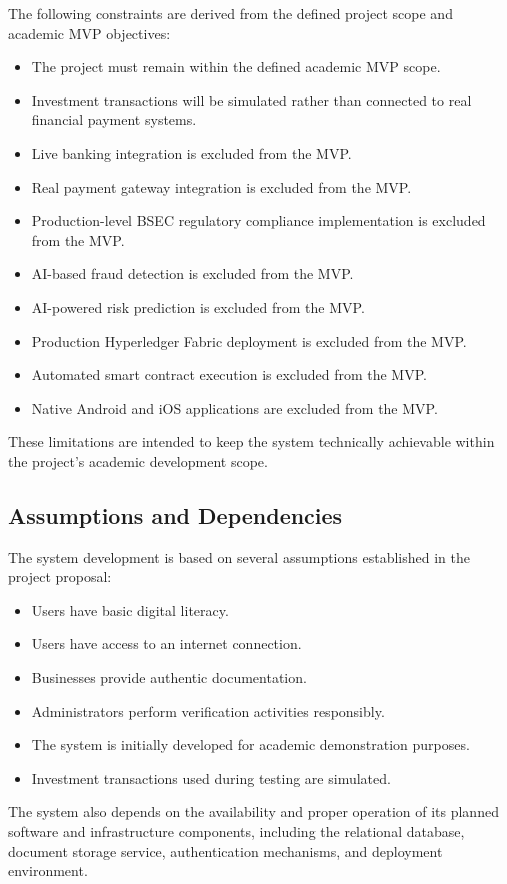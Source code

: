 The following constraints are derived from the defined project scope and
academic MVP objectives:

\begin{itemize}
    \item The project must remain within the defined academic MVP scope.
    \item Investment transactions will be simulated rather than connected to
    real financial payment systems.
    \item Live banking integration is excluded from the MVP.
    \item Real payment gateway integration is excluded from the MVP.
    \item Production-level BSEC regulatory compliance implementation is
    excluded from the MVP.
    \item AI-based fraud detection is excluded from the MVP.
    \item AI-powered risk prediction is excluded from the MVP.
    \item Production Hyperledger Fabric deployment is excluded from the MVP.
    \item Automated smart contract execution is excluded from the MVP.
    \item Native Android and iOS applications are excluded from the MVP.
\end{itemize}

These limitations are intended to keep the system technically achievable
within the project's academic development scope.


\subsection{Assumptions and Dependencies}

The system development is based on several assumptions established in the
project proposal:

\begin{itemize}
    \item Users have basic digital literacy.
    \item Users have access to an internet connection.
    \item Businesses provide authentic documentation.
    \item Administrators perform verification activities responsibly.
    \item The system is initially developed for academic demonstration
    purposes.
    \item Investment transactions used during testing are simulated.
\end{itemize}

The system also depends on the availability and proper operation of its
planned software and infrastructure components, including the relational
database, document storage service, authentication mechanisms, and
deployment environment.